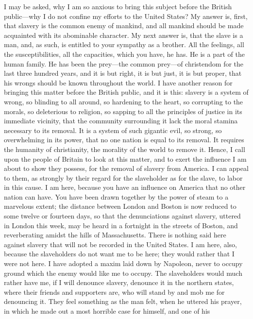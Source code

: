 I may be asked, why I am so anxious to bring this subject before the
British public---why I do not confine my efforts to the United States?
My answer is, first, that slavery is the common enemy of mankind, and
all mankind should be made acquainted with its abominable character. My
next answer is, that the slave is a man, and, as such, is entitled to
your sympathy as a brother. All the feelings, all the susceptibilities,
all the capacities, which you have, he has. He is a part of the human
family. He has been the prey---the common prey---of christendom for the
last three hundred years, and it is but right, it is but just, it is but
proper, that his wrongs should be known throughout the world. I have
another reason for bringing this matter before the British public, and
it is this: slavery is a system of wrong, so blinding to all around, so
hardening to the heart, so corrupting to the morals, so deleterious to
religion, so sapping to all the principles of justice in its immediate
vicinity, that the community surrounding it lack the moral
{\protect\hypertarget{417}{}{}}stamina necessary to its removal. It is a
system of such gigantic evil, so strong, so overwhelming in its power,
that no one nation is equal to its removal. It requires the humanity of
christianity, the morality of the world to remove it. Hence, I call upon
the people of Britain to look at this matter, and to exert the influence
I am about to show they possess, for the removal of slavery from
America. I can appeal to them, as strongly by their regard for the
slaveholder as for the slave, to labor in this cause. I am here, because
you have an influence on America that no other nation can have. You have
been drawn together by the power of steam to a marvelous extent; the
distance between London and Boston is now reduced to some twelve or
fourteen days, so that the denunciations against slavery, uttered in
London this week, may be heard in a fortnight in the streets of Boston,
and reverberating amidst the hills of Massachusetts. There is nothing
said here against slavery that will not be recorded in the United
States. I am here, also, because the slaveholders do not want me to be
here; they would rather that I were not here. I have adopted a maxim
laid down by Napoleon, never to occupy ground which the enemy would like
me to occupy. The slaveholders would much rather have me, if I will
denounce slavery, denounce it in the northern states, where their
friends and supporters are, who will stand by and mob me for denouncing
it. They feel something as the man felt, when he uttered his prayer, in
which he made out a most horrible case for himself, and one of his
